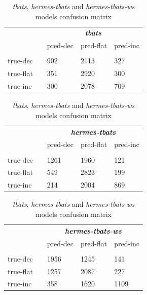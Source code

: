 \documentclass{article} %
\begin{document}
\begin{table}
  \caption{\textit{tbats}, \textit{hermes-tbats} and \textit{hermes-tbats-ws} models confusion matrix }
  \begin{tabular}{l||llll}
  	&& \multicolumn{3}{c}{\textbf{\textit{tbats}}}\\
    && pred-dec  & pred-flat & pred-inc  \\
    \hline
    \hline
    \rule{0pt}{2ex} \\
	true-dec && 902 & 2113 & 327 \\
    true-flat && 351 & 2920 & 300 \\
    true-inc && 300 & 2078 & 709 \\
  \end{tabular}
  \vspace{1cm}
  \begin{tabular}{l||llll}
  	&& \multicolumn{3}{c}{\textbf{\textit{hermes-tbats}}}\\
    && pred-dec  & pred-flat & pred-inc  \\
    \hline
    \hline
    \rule{0pt}{2ex} \\
	true-dec && 1261 & 1960 & 121 \\
    true-flat && 549 & 2823 & 199 \\
    true-inc && 214 & 2004 & 869 \\
  \end{tabular}
  \centering
  \begin{tabular}{l||llll}
    && \multicolumn{3}{c}{\textbf{\textit{hermes-tbats-ws}}}\\
    && pred-dec  & pred-flat & pred-inc  \\
    \hline
    \hline
    \rule{0pt}{2ex} \\
	true-dec && 1956 & 1245 & 141 \\
    true-flat && 1257 & 2087 & 227 \\
    true-inc && 358 & 1620 & 1109 \\
  \end{tabular}
\label{tab:tbatsclass}
\end{table}
\end{document}
